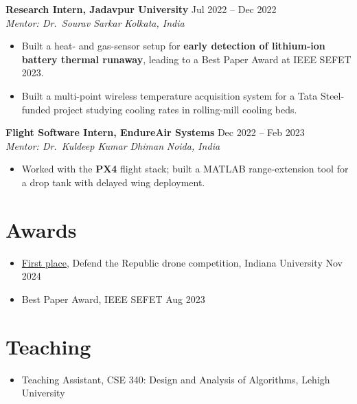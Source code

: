\documentclass[11pt,letterpaper]{article}
\newcommand{\entry}[4]{%
  \textbf{#1} \hfill #2 \\
  \textit{#3} \hfill \textit{#4}\par\vspace{1pt}}
\begin{document}
\vspace{4pt}
\entry{Research Intern, Jadavpur University}{Jul 2022 -- Dec 2022}
      {Mentor: Dr.\ Sourav Sarkar}{Kolkata, India}
\begin{itemize}
  \item Built a heat- and gas-sensor setup for \textbf{early detection of lithium-ion battery thermal runaway},
        leading to a Best Paper Award at IEEE SEFET 2023.
  \item Built a multi-point wireless temperature acquisition system for a Tata Steel-funded project
        studying cooling rates in rolling-mill cooling beds.
\end{itemize}

\vspace{4pt}
\entry{Flight Software Intern, EndureAir Systems}{Dec 2022 -- Feb 2023}
      {Mentor: Dr.\ Kuldeep Kumar Dhiman}{Noida, India}
\begin{itemize}
  \item Worked with the \textbf{PX4} flight stack; built a MATLAB range-extension tool for a drop tank with delayed wing deployment.
\end{itemize}

\section{Awards}
\begin{itemize}
  \item \href{https://engineering.lehigh.edu/news/article/lehigh-robotics-team-soars-victory-defend-republic-drone-competition}{First place}, Defend the Republic drone competition, Indiana University \hfill Nov 2024
  \item Best Paper Award, IEEE SEFET \hfill Aug 2023
\end{itemize}

\section{Teaching}
\begin{itemize}
  \item Teaching Assistant, CSE 340: Design and Analysis of Algorithms, Lehigh University
\end{itemize}

\end{document}

